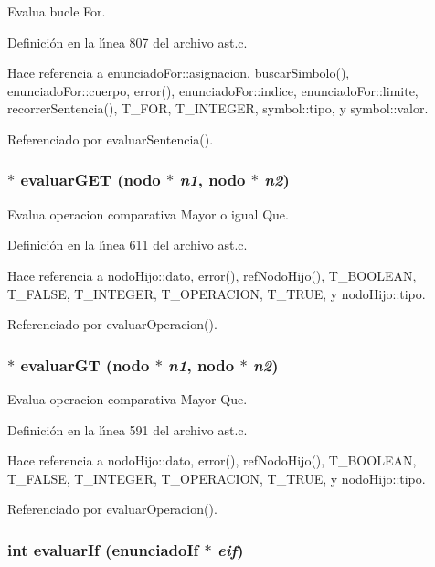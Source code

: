 Evalua bucle For. 



Definici\'{o}n en la l\'{\i}nea 807 del archivo ast.c.

Hace referencia a enunciado\-For::asignacion, buscar\-Simbolo(), enunciado\-For::cuerpo, error(), enunciado\-For::indice, enunciado\-For::limite, recorrer\-Sentencia(), T\_\-FOR, T\_\-INTEGER, symbol::tipo, y symbol::valor.

Referenciado por evaluar\-Sentencia().
\subsubsection{$\ast$ evaluar\-GET ({\bf nodo} $\ast$ {\em n1}, {\bf nodo} $\ast$ {\em n2})}\label{ast_8h_a45}


Evalua operacion comparativa Mayor o igual Que. 



Definici\'{o}n en la l\'{\i}nea 611 del archivo ast.c.

Hace referencia a nodo\-Hijo::dato, error(), ref\-Nodo\-Hijo(), T\_\-BOOLEAN, T\_\-FALSE, T\_\-INTEGER, T\_\-OPERACION, T\_\-TRUE, y nodo\-Hijo::tipo.

Referenciado por evaluar\-Operacion().
\subsubsection{$\ast$ evaluar\-GT ({\bf nodo} $\ast$ {\em n1}, {\bf nodo} $\ast$ {\em n2})}\label{ast_8h_a44}


Evalua operacion comparativa Mayor Que. 



Definici\'{o}n en la l\'{\i}nea 591 del archivo ast.c.

Hace referencia a nodo\-Hijo::dato, error(), ref\-Nodo\-Hijo(), T\_\-BOOLEAN, T\_\-FALSE, T\_\-INTEGER, T\_\-OPERACION, T\_\-TRUE, y nodo\-Hijo::tipo.

Referenciado por evaluar\-Operacion().
\subsubsection{\setlength{\rightskip}{0pt plus 5cm}int evaluar\-If ({\bf enunciado\-If} $\ast$ {\em eif})}\label{ast_8h_a54}


